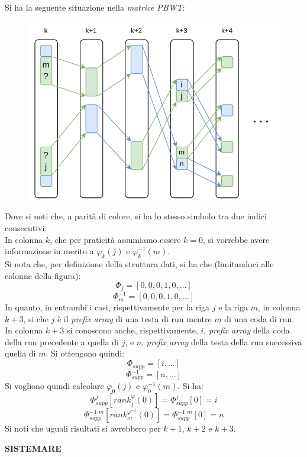 \begin{esempio}
  Si ha la seguente situazione nella \textit{matrice PBWT}:
  \begin{figure}[H]
    \centering
    \includegraphics[scale = 0.8]{img/phi.pdf}   
  \end{figure}
  Dove si noti che, a parità di colore, si ha lo stesso simbolo tra due indici
  consecutivi. \\
  In colonna $k$, che per praticità assumiamo essere $k=0$, si vorrebbe avere
  informazione in merito a $\varphi_k(j)$ e $\varphi^{-1}_k(m)$. \\
  Si nota che, per definizione della struttura dati, si ha che (limitandoci alle
  colonne della figura):
  \[\varPhi_j=[0,0,0,1,0, \ldots]\]
  \[\varPhi^{-1}_m=[0,0,0,1,0,\ldots]\]
  In quanto, in entrambi i casi, rispettivamente per la riga $j$ e la riga $m$,
  in colonna $k+3$, si che $j$ è il \textit{prefix array} di una testa di run
  mentre $m$ di una coda di run. In colonna $k+3$ si conoscono anche,
  rispettivamente, $i$, \textit{prefix array} della coda della run precedente a
  quella di $j$, e $n$, \textit{prefix array} della testa della run successiva
  quella di $m$. Si ottengono quindi:
  \[\varPhi_{supp}=[i,\ldots]\]
  \[\varPhi^{-1}_{supp}=[n,\ldots]\]
  Si vogliono quindi calcolare $\varphi_0(j)$ e  $\varphi^{-1}_0(m)$. Si ha:
  \[\varPhi_{supp}^j[rank^\varphi_j(0)]=\varPhi_{supp}^j[0]=i\]
  \[\varPhi^{-1\,\,m}_{supp}[rank^{\varphi^{-1}}_m(0)]=\varPhi^{-1\,\,m}_{supp}[0]=n\]
  Si noti che uguali risultati si avrebbero per $k+1$, $k+2$ e $k+3$.
\end{esempio}
\textbf{SISTEMARE}\\
 